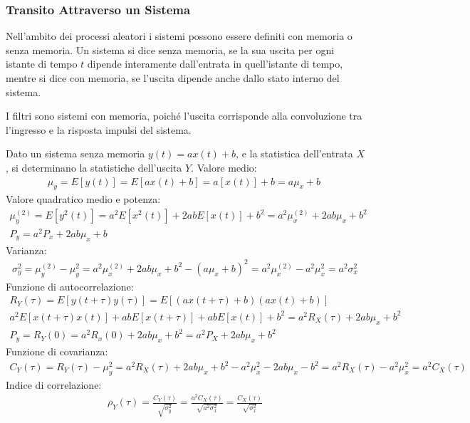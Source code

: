 \documentclass{article}
\numberwithin{equation}{subsection}
\begin{document}
\subsubsection{Transito Attraverso un Sistema}

Nell'ambito dei processi aleatori i sistemi possono essere definiti con memoria o senza memoria. Un sistema si dice senza memoria, se la sua uscita per ogni istante di 
tempo $t$ dipende interamente dall'entrata in quell'istante di tempo, mentre si dice con memoria, se l'uscita dipende anche dallo stato interno del sistema. 

I filtri sono sistemi con memoria, poiché l'uscita corrisponde alla convoluzione tra l'ingresso e la risposta impulsi del sistema. 

Dato un sistema senza memoria $y(t)=ax(t)+b$, e la statistica dell'entrata $X$, si determinano la statistiche dell'uscita $Y$. Valore medio:
\begin{gather*}
    \mu_y=E[y(t)]=E[ax(t)+b]=a[x(t)]+b=a\mu_x+b\
\end{gather*}
Valore quadratico medio e potenza:
\begin{gather*}
    \mu_y^{(2)}=E[y^2(t)]=a^2E[x^2(t)]+2abE[x(t)]+b^2=a^2\mu_x^{(2)}+2ab\mu_x+b^2\\
    P_y=a^2P_x+2ab\mu_x+b
\end{gather*}
Varianza:
\begin{gather*}
    \sigma_y^2=\mu_y^{(2)}-\mu_y^2=a^2\mu_x^{(2)}+2ab\mu_x+b^2-(a\mu_x+b)^2=a^2\mu_x^{(2)}-a^2\mu_x^2=a^2\sigma_x^2
\end{gather*}
Funzione di autocorrelazione:
\begin{gather*}
    R_Y(\tau)=E[y(t+\tau)y(\tau)]=E[(ax(t+\tau)+b)(ax(t)+b)]\\
    a^2E[x(t+\tau)x(t)]+abE[x(t+\tau)]+abE[x(t)]+b^2=a^2R_X(\tau)+2ab\mu_x+b^2\\
    P_y=R_Y(0)=a^2R_x(0)+2ab\mu_x+b^2=a^2P_X+2ab\mu_x+b^2
\end{gather*}
Funzione di covarianza:
\begin{gather*}
    C_Y(\tau)=R_Y(\tau)-\mu_y^2=a^2R_X(\tau)+2ab\mu_x+b^2-a^2\mu_x^2-2ab\mu_x-b^2=a^2R_X(\tau)-a^2\mu_x^2=a^2C_X(\tau)
\end{gather*}
Indice di correlazione:
\begin{gather*}
    \rho_Y(\tau)=\displaystyle\frac{C_Y(\tau)}{\sqrt{\sigma_y^2}}=\frac{a^2C_X(\tau)}{\sqrt{a^2\sigma_x^2}}=\frac{C_X(\tau)}{\sqrt{\sigma_x^2}}
\end{gather*}
\end{document}

